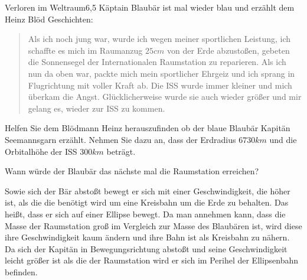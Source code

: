 \begin{problem}{Verloren im Weltraum}{6,5}
Käptain Blaubär ist mal wieder blau und erzählt dem Heinz Blöd Geschichten:
\begin{quote}
 Als ich noch jung war, wurde ich wegen meiner sportlichen Leistung, ich schaffte es mich im Raumanzug $25\unit{cm}$ von der Erde abzustoßen, gebeten die Sonnensegel der Internationalen Raumstation zu reparieren. Als ich nun da oben war, packte mich mein sportlicher Ehrgeiz und ich sprang in Flugrichtung mit voller Kraft ab. Die ISS wurde immer kleiner und mich überkam die Angst. Glücklicherweise wurde sie auch wieder größer und mir gelang es, wieder zur ISS zu kommen.
\end{quote}
\begin{abcenum}
 \item Helfen Sie dem Blödmann Heinz herauszufinden ob der blaue Blaubär Kapitän Seemannsgarn erzählt. Nehmen Sie dazu an, dass der Erdradius $6730\unit{km}$ und die Orbitalhöhe der ISS $300\unit{km}$ beträgt.
 \item Wann würde der Blaubär das nächste mal die Raumstation erreichen?
\end{abcenum}
\begin{solution}
Sowie sich der Bär abstoßt bewegt er sich mit einer Geschwindigkeit, die höher ist, als die die benötigt wird um eine Kreisbahn um die Erde zu behalten. Das heißt, dass er sich auf einer Ellipse bewegt. Da man annehmen kann, dass die Masse der Raumstation groß im Vergleich zur Masse des Blaubären ist, wird diese ihre Geschwindigkeit kaum ändern und ihre Bahn ist als Kreisbahn zu nähern. Da sich der Kapitän in Bewegungsrichtung abstoßt und seine Geschwindigkeit leicht größer ist als die der Raumstation wird er sich im Perihel der Ellipsenbahn befinden.


\end{solution}
\end{problem}
